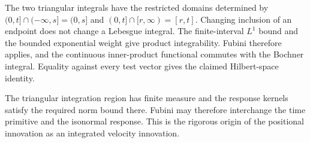 \documentclass[11pt,a4paper]{article}
\begin{document}
The two triangular integrals have the restricted domains determined by \((0,t]\cap(-\infty,s]=(0,s]\) and \((0,t]\cap[r,\infty)=[r,t]\). Changing inclusion of an endpoint does not change a Lebesgue integral. The finite-interval \(L^{1}\) bound and the bounded exponential weight give product integrability. Fubini therefore applies, and the continuous inner-product functional commutes with the Bochner integral. Equality against every test vector gives the claimed Hilbert-space identity.



The triangular integration region has finite measure and the response kernels satisfy the required norm bound there. Fubini may therefore interchange the time primitive and the isonormal response. This is the rigorous origin of the positional innovation as an integrated velocity innovation.
\end{document}

